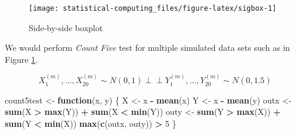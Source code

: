 \documentclass[]{book}
\newenvironment{Shaded}{\begin{snugshade}}{\end{snugshade}}
\newcommand{\ControlFlowTok}[1]{\textcolor[rgb]{0.13,0.29,0.53}{\textbf{#1}}}
\newcommand{\DataTypeTok}[1]{\textcolor[rgb]{0.13,0.29,0.53}{#1}}
\newcommand{\DecValTok}[1]{\textcolor[rgb]{0.00,0.00,0.81}{#1}}
\newcommand{\FloatTok}[1]{\textcolor[rgb]{0.00,0.00,0.81}{#1}}
\newcommand{\KeywordTok}[1]{\textcolor[rgb]{0.13,0.29,0.53}{\textbf{#1}}}
\newcommand{\NormalTok}[1]{#1}
\newcommand{\OperatorTok}[1]{\textcolor[rgb]{0.81,0.36,0.00}{\textbf{#1}}}
\newcommand{\StringTok}[1]{\textcolor[rgb]{0.31,0.60,0.02}{#1}}
\theoremstyle{definition}
\theoremstyle{definition}
\theoremstyle{definition}
\theoremstyle{remark}
\begin{document}
\begin{Shaded}
\end{Shaded}

\begin{figure}[H]

{\centering \texttt{[image: statistical-computing\_files/figure-latex/sigbox-1]} 

}

\caption{Side-by-side boxplot}\label{fig:sigbox}
\end{figure}

We would perform \emph{Count Five} test for multiple simulated data sets such as in Figure \ref{fig:sigbox}.

\[X_1^{(m)}, \ldots, X_{20}^{(m)} \sim N(0, 1) \perp\!\!\!\perp Y_1^{(m)}, \ldots, Y_{20}^{(m)} \sim N(0, 1.5)\]

\begin{Shaded}
\begin{Highlighting}[]
\NormalTok{count5test <-}\StringTok{ }\ControlFlowTok{function}\NormalTok{(x, y) \{}
\NormalTok{  X <-}\StringTok{ }\NormalTok{x }\OperatorTok{-}\StringTok{ }\KeywordTok{mean}\NormalTok{(x)}
\NormalTok{  Y <-}\StringTok{ }\NormalTok{x }\OperatorTok{-}\StringTok{ }\KeywordTok{mean}\NormalTok{(y)}
\NormalTok{  outx <-}\StringTok{ }\KeywordTok{sum}\NormalTok{(X }\OperatorTok{>}\StringTok{ }\KeywordTok{max}\NormalTok{(Y)) }\OperatorTok{+}\StringTok{ }\KeywordTok{sum}\NormalTok{(X }\OperatorTok{<}\StringTok{ }\KeywordTok{min}\NormalTok{(Y))}
\NormalTok{  outy <-}\StringTok{ }\KeywordTok{sum}\NormalTok{(Y }\OperatorTok{>}\StringTok{ }\KeywordTok{max}\NormalTok{(X)) }\OperatorTok{+}\StringTok{ }\KeywordTok{sum}\NormalTok{(Y }\OperatorTok{<}\StringTok{ }\KeywordTok{min}\NormalTok{(X))}
  \KeywordTok{max}\NormalTok{(}\KeywordTok{c}\NormalTok{(outx, outy)) }\OperatorTok{>}\StringTok{ }\DecValTok{5}
\NormalTok{\}}
\end{Highlighting}
\end{Shaded}
\end{document}
